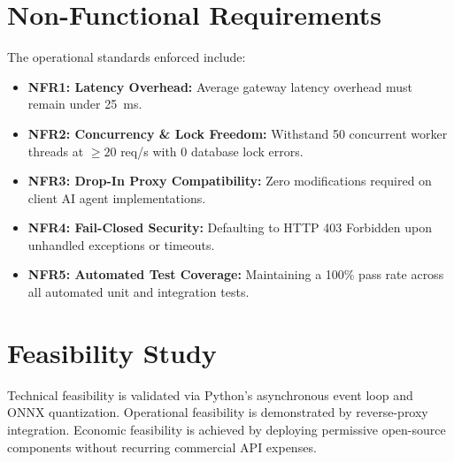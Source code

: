 \section{Non-Functional Requirements}
The operational standards enforced include:
\begin{itemize}
    \item \textbf{NFR1: Latency Overhead:} Average gateway latency overhead must remain under 25~ms.
    \item \textbf{NFR2: Concurrency \& Lock Freedom:} Withstand 50 concurrent worker threads at $\ge 20$ req/s with 0 database lock errors.
    \item \textbf{NFR3: Drop-In Proxy Compatibility:} Zero modifications required on client AI agent implementations.
    \item \textbf{NFR4: Fail-Closed Security:} Defaulting to HTTP 403 Forbidden upon unhandled exceptions or timeouts.
    \item \textbf{NFR5: Automated Test Coverage:} Maintaining a 100\% pass rate across all automated unit and integration tests.
\end{itemize}

\section{Feasibility Study}
Technical feasibility is validated via Python's asynchronous event loop and ONNX quantization. Operational feasibility is demonstrated by reverse-proxy integration. Economic feasibility is achieved by deploying permissive open-source components without recurring commercial API expenses.
